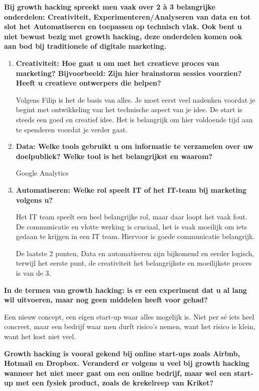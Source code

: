 \textbf{Bij growth hacking spreekt men vaak over 2 à 3 belangrijke onderdelen: Creativiteit, Experimenteren/Analyseren van data en tot slot het Automatiseren en toepassen op technisch vlak. Ook bent u niet bewust bezig met growth hacking, deze onderdelen komen ook aan bod bij traditionele of digitale marketing.}
\begin{enumerate}[label*=\arabic*.]
	\item \textbf{Creativiteit: Hoe gaat u om met het creatieve proces van marketing? Bijvoorbeeld: Zijn hier brainstorm sessies voorzien? Heeft u creatieve ontwerpers die helpen?}
	
	Volgens Filip is het de basis van alles. Je moet eerst veel nadenken voordat je begint met ontwikkeling van het technische aspect van je idee. De start is steeds een goed en creatief idee. Het is belangrijk om hier voldoende tijd aan te spenderen voordat je verder gaat.
	
	\item \textbf{Data: Welke tools gebruikt u om informatie te verzamelen over uw doelpubliek? Welke tool is het belangrijkst en waarom?}
	
	Google Analytics
	
	\item \textbf{Automatiseren: Welke rol speelt IT of het IT-team bij marketing volgens u? }
	
	Het IT team speelt een heel belangrijke rol, maar daar loopt het vaak fout. De communicatie en vlotte werking is cruciaal, het is vaak moeilijk om iets gedaan te krijgen in een IT team. Hiervoor is goede communicatie belangrijk.
	
	De laatste 2 punten, Data en automatiseren zijn bijkomend en eerder logisch, terwijl het eerste punt, de creativiteit het belangrijkste en moeilijkste proces is van de 3.
	
\end{enumerate}
\textbf{In de termen van growth hacking: is er een experiment dat u al lang wil uitvoeren, maar nog geen middelen heeft voor gehad?}

Een nieuw concept, een eigen start-up waar alles mogelijk is. Niet per sé iets heel concreet, maar een bedrijf waar men durft risico's nemen, want het risico is klein, want het kost niet veel.

\textbf{Growth hacking is vooral gekend bij online start-ups zoals Airbnb, Hotmail en Dropbox. Veranderd er volgens u veel bij growth hacking wanneer het niet meer gaat om een online bedrijf, maar wel een start-up met een fysiek product, zoals de krekelreep van Kriket?}

